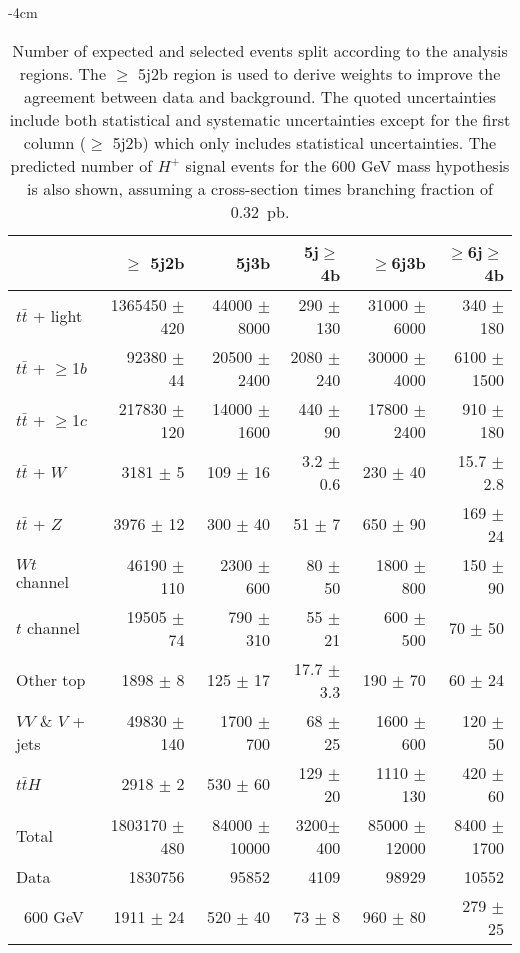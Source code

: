 \begin{table}[htb]
    \small
    \addtolength{\leftskip} {-4cm} %
    \addtolength{\rightskip}{-4cm}
    \centering
    \begin{tabular}{l r r r r r}
        \toprule\toprule
          & $\geq$ 5j2b & {5j3b} & {5j$\geq$4b} & {$\geq$6j3b} & {$\geq$6j$\geq$4b}\\
          \midrule 
  $t\bar{t}$ + light        & 1365450 $\pm$ 420 & 44000 $\pm$ 8000  & 290 $\pm$ 130  & 31000 $\pm$ 6000  & 340 $\pm$ 180 \\ 
  $t\bar{t}$ + $\geq$1$b$   & 92380   $\pm$ 44 & 20500  $\pm$ 2400  & 2080 $\pm$ 240 & 30000 $\pm$ 4000  & 6100 $\pm$ 1500   \\ 
  $t\bar{t}$ + $\geq$1$c$   & 217830  $\pm$ 120 & 14000 $\pm$ 1600  & 440 $\pm$ 90   & 17800 $\pm$ 2400  & 910  $\pm$ 180   \\ 
  $t\bar{t}$ + $W$          & 3181    $\pm$ 5   & 109   $\pm$ 16    & 3.2 $\pm$ 0.6  & 230   $\pm$ 40    & 15.7   $\pm$ 2.8 \\ 
  $t\bar{t}$ + $Z$          & 3976    $\pm$ 12  & 300   $\pm$ 40    & 51  $\pm$ 7    & 650   $\pm$ 90    & 169  $\pm$ 24 \\ 
  $Wt$ channel              & 46190   $\pm$ 110 & 2300  $\pm$ 600   & 80  $\pm$ 50   & 1800  $\pm$ 800   & 150  $\pm$ 90 \\ 
  $t$ channel               & 19505   $\pm$ 74  & 790   $\pm$ 310   & 55  $\pm$ 21   & 600   $\pm$ 500   & 70   $\pm$ 50 \\ 
  Other top         & 1898    $\pm$ 8   & 125   $\pm$ 17    & 17.7  $\pm$ 3.3    & 190   $\pm$ 70    & 60   $\pm$ 24 \\ 
  $VV$ \& $V$ + jets        & 49830   $\pm$ 140 & 1700  $\pm$ 700   & 68  $\pm$ 25   & 1600  $\pm$ 600   & 120  $\pm$ 50 \\ 
  $t\bar{t}H$               & 2918    $\pm$ 2   & 530   $\pm$ 60    & 129 $\pm$ 20   & 1110  $\pm$ 130   & 420  $\pm$ 60 \\ 
\midrule      
  Total                     &1803170 $\pm$ 480 & 84000 $\pm$ 10000 & 3200$\pm$ 400 & 85000 $\pm$ 12000 & 8400 $\pm$ 1700 \\
\midrule
  Data                      &1830756           & 95852             & 4109          & 98929          & 10552 \\
\midrule  
\midrule\ 600 GeV             & 1911 $\pm$ 24   & 520 $\pm$ 40      & 73 $\pm$ 8    & 960 $\pm$ 80   & 279 $\pm$ 25  \\   
\bottomrule\bottomrule                               
    \end{tabular}
    \caption{Number of expected and selected events split according to the analysis regions. The $\geq$ 5j2b region is used to derive weights to improve the agreement between data and background. The quoted uncertainties include both statistical and systematic uncertainties except for the first column ($\geq$ 5j2b) which only includes statistical uncertainties. The predicted number of $H^+$ signal events for the 600 GeV mass hypothesis is also shown, assuming a cross-section times branching fraction of 0.32~pb.}
    \label{Hplustb:prefityields}
\end{table}

